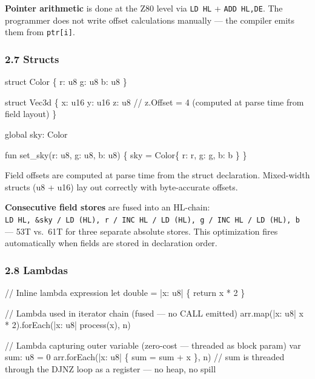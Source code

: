 \documentclass[
  11pt,
  a4paper,
]{report}
\newenvironment{Shaded}{\begin{snugshade}\small}{\end{snugshade}}
\newcommand{\NormalTok}[1]{#1}
\begin{document}
\textbf{Pointer arithmetic} is done at the Z80 level via \texttt{LD\ HL}
+ \texttt{ADD\ HL,DE}. The programmer does not write offset calculations
manually --- the compiler emits them from \texttt{ptr{[}i{]}}.

\subsubsection{2.7 Structs}\label{structs}

\begin{Shaded}
\begin{Highlighting}[]
\NormalTok{struct Color \{}
\NormalTok{    r: u8}
\NormalTok{    g: u8}
\NormalTok{    b: u8}
\NormalTok{\}}

\NormalTok{struct Vec3d \{}
\NormalTok{    x: u16}
\NormalTok{    y: u16}
\NormalTok{    z: u8       // z.Offset = 4 (computed at parse time from field layout)}
\NormalTok{\}}

\NormalTok{global sky: Color}

\NormalTok{fun set\_sky(r: u8, g: u8, b: u8) \{}
\NormalTok{    sky = Color\{ r: r, g: g, b: b \}}
\NormalTok{\}}
\end{Highlighting}
\end{Shaded}

Field offsets are computed at parse time from the struct declaration.
Mixed-width structs (u8 + u16) lay out correctly with byte-accurate
offsets.

\textbf{Consecutive field stores} are fused into an HL-chain:
\texttt{LD\ HL,\ \&sky\ /\ LD\ (HL),\ r\ /\ INC\ HL\ /\ LD\ (HL),\ g\ /\ INC\ HL\ /\ LD\ (HL),\ b}
--- 53T vs.~61T for three separate absolute stores. This optimization
fires automatically when fields are stored in declaration order.

\subsubsection{2.8 Lambdas}\label{lambdas}

\begin{Shaded}
\begin{Highlighting}[]
\NormalTok{// Inline lambda expression}
\NormalTok{let double = |x: u8| \{ return x * 2 \}}

\NormalTok{// Lambda used in iterator chain (fused — no CALL emitted)}
\NormalTok{arr.map(|x: u8| x * 2).forEach(|x: u8| process(x), n)}

\NormalTok{// Lambda capturing outer variable (zero{-}cost — threaded as block param)}
\NormalTok{var sum: u8 = 0}
\NormalTok{arr.forEach(|x: u8| \{ sum = sum + x \}, n)}
\NormalTok{// sum is threaded through the DJNZ loop as a register — no heap, no spill}
\end{Highlighting}
\end{Shaded}
\end{document}
